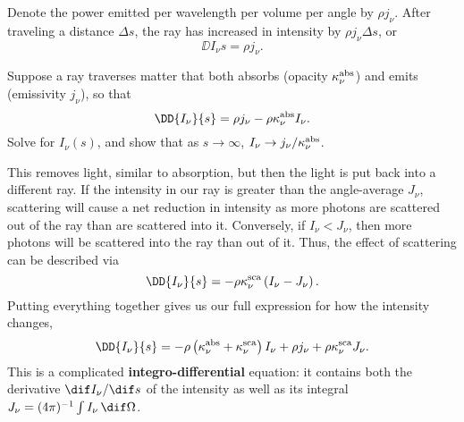  Denote the power emitted per wavelength per volume per angle by $\rho j_{\nu}$. After traveling a distance $\Delta s$, the ray has increased in intensity by $\rho j_{\nu}\Delta s$, or
\begin{equation}\label{e.emission-microscopic}
\DD{I_{\nu}}{s} = \rho j_{\nu}.
\end{equation}

\begin{exercisebox}
Suppose a ray traverses matter that both absorbs (opacity $\kappa_\nu^{\mathrm{abs}}$) and emits (emissivity $j_{\nu}$), so that
\[	\DD{I_{\nu}}{s} = \rho j_{\nu} - \rho\kapabs I_{\nu}. \]
Solve for $I_{\nu}(s)$, and show that as $s\to\infty$, $I_{\nu}\to j_{\nu}/\kappa_\nu^{\mathrm{abs}}$.
\end{exercisebox}

 This removes light, similar to absorption, but then the light is put back into a different ray. If the intensity in our ray is greater than the angle-average $J_{\nu}$, scattering will cause a net reduction in intensity as more photons are scattered out of the ray than are scattered into it. Conversely, if $I_{\nu} < J_{\nu}$, then more photons will be scattered into the ray than out of it. Thus, the effect of scattering can be described via
\begin{equation}\label{e.scattering-microscopic}
\DD{I_{\nu}}{s} = -\rho\kapscat \left(I_{\nu} - J_{\nu}\right).
\end{equation}
Putting everything together gives us our full expression for how the intensity changes,
\begin{equation}\label{e.transfer-equation}
\DD{I_{\nu}}{s} = -\rho\left(\kapabs + \kapscat\right) I_{\nu} + \rho j_{\nu} + \rho\kapscat J_{\nu}.
\end{equation}
This is a complicated \textbf{integro-differential} equation: it contains both the derivative $\dif I_{\nu}/\dif s$ of the intensity as well as its integral $J_{\nu} = (4\pi)^{-1}\int I_{\nu}\,\dif\Omega$.

